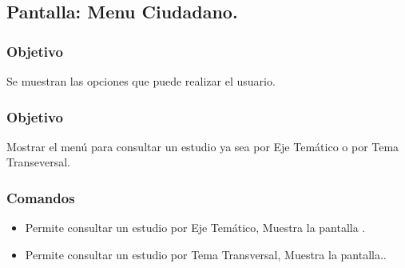 \subsection{Pantalla: Menu Ciudadano.}

\subsubsection{Objetivo}
  Se muestran las opciones que puede realizar el usuario.

\subsubsection{Objetivo}
Mostrar el menú para consultar un estudio ya sea por Eje Temático o por Tema Transeversal.


\subsubsection{Comandos}
\begin{itemize}
 \item {} Permite consultar un estudio por Eje Temático, Muestra la pantalla .
 \item {} Permite consultar un estudio por Tema Transversal, Muestra la pantalla..

\end{itemize}